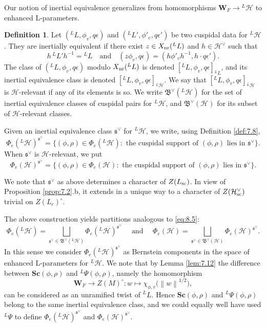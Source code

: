 \documentclass[11pt]{amsart}
\theoremstyle{definition}
\newtheorem{defn}[thm]{Definition}
\providecommand{\norm}[1]{\left\| #1 \right\|}
\newcommand{\mb}{\mathbf}
\newcommand{\mf}{\mathfrak}
\def\cH{{\mathcal H}}
\def\nr{{\rm nr}}
\def\fs{{\mathfrak s}}
\def\sc{{\rm sc}}
\begin{document}
Our notion of inertial equivalence generalizes \cite[Definition 5.33]{Hai} from 
homomorphisms $\mb W_F \to {}^L \cH$ to enhanced L-parameters.
\begin{defn}\label{def:8.4}
Let $({}^L L,\phi_v,q \epsilon)$ and $({}^L L',\phi'_v,q \epsilon')$ be two cuspidal 
data for ${}^L \cH$. They are inertially equivalent if there exist 
$z \in X_\nr ({}^L L)$ and $h \in \cH^\vee$ such that 
\[
h \, {}^L L' h^{-1} = {}^L L \quad \text{and} \quad 
(z \phi_v,q \epsilon) = (h \phi'_v h^{-1}, h \cdot q \epsilon').
\]
The class of $({}^L L,\phi_v,q \epsilon)$ modulo $X_\nr ({}^L L)$ is denoted
$[{}^L L,\phi_v ,q \epsilon ]_{{}^L L}$, and its inertial equivalence class is denoted
$[{}^L L,\phi_v ,q \epsilon ]_{{}^L \cH}$.
We say that $[{}^L L,\phi_v ,q \epsilon]_{{}^L \cH}$ is $\cH$-relevant if any of its 
elements is so. We write $\mf B^\vee ({}^L \cH)$ for the set of inertial 
equivalence classes of cuspidal pairs for ${}^L \cH$, and $\mf B^\vee (\cH)$ 
for its subset of $\cH$-relevant classes.

Given an inertial equivalence class $\fs^\vee$ for ${}^L \cH$, we write,
using Definition \ref{def:7.8},
\[
\Phi_e ({}^L \cH)^{\fs^\vee} = \{ (\phi,\rho) \in \Phi_e ({}^L \cH) :
\text{ the cuspidal support of } (\phi,\rho) \text{ lies in } \fs^\vee \} .
\]
When $\fs^\vee$ is $\cH$-relevant, we put
\[
\Phi_e (\cH)^{\fs^\vee} = \{ (\phi,\rho) \in \Phi_e (\cH) :
\text{ the cuspidal support of } (\phi,\rho) \text{ lies in } \fs^\vee \} .
\]
\end{defn}
We note that $\fs^\vee$ as above determines a character of $Z(L_\sc)$. 
In view of Proposition \ref{prop:7.2}.b, it extends in a unique way 
to a character of $Z(\cH^\vee_\sc)$ trivial on $Z(L_c)^\circ$.

The above construction yields partitions analogous to \eqref{eq:8.5}:
\begin{equation}\label{eq:8.4}
\Phi_e ({}^L \cH) = \bigsqcup_{\fs^\vee \in \mf B^\vee ({}^L \cH)} 
\Phi_e ({}^L \cH)^{\fs^\vee} \quad \text{ and } \quad \Phi_e (\cH) = 
\bigsqcup_{\fs^\vee \in \mf B^\vee (\cH)} \Phi_e (\cH)^{\fs^\vee} .
\end{equation}
In this sense we consider $\Phi_e ({}^L \cH)^{\fs^\vee}$ as Bernstein
components in the space of enhanced L-parameters for ${}^L \cH$.
We note that by Lemma \ref{lem:7.12} the difference between $\mathbf{Sc}
(\phi,\rho)$ and ${}^L \Psi (\phi,\rho)$, namely the homomorphism 
\[
\mb W_F \to Z(M)^\circ : w \mapsto \chi_{\phi,v} \big( \norm{w}^{1/2} \big),
\]
can be considered as an unramified twist of ${}^L L$. Hence $\mathbf{Sc}
(\phi,\rho)$ and ${}^L \Psi (\phi,\rho)$ belong to the same inertial
equivalence class, and we could equally well have used ${}^L \Psi$ to
define $\Phi_e ({}^L \cH)^{\fs^\vee}$ and $\Phi_e (\cH)^{\fs^\vee}$.
\end{document}
